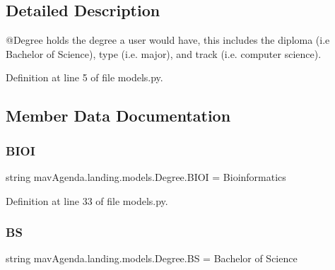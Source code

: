 \subsection{Detailed Description}
\begin{DoxyVerb}@Degree holds the degree a user would have, this includes the
        diploma (i.e Bachelor of Science), type (i.e. major),
        and track (i.e. computer science).
\end{DoxyVerb}
 

Definition at line 5 of file models.\+py.



\subsection{Member Data Documentation}
\mbox{\label{classmavAgenda_1_1landing_1_1models_1_1Degree_ab8fae6c0bef1560ac8435e4d6c555a3a}} 
\subsubsection{\texorpdfstring{B\+I\+OI}{BIOI}}
{\footnotesize\ttfamily string mav\+Agenda.\+landing.\+models.\+Degree.\+B\+I\+OI = \textquotesingle{}Bioinformatics\textquotesingle{}\hspace{0.3cm}{\ttfamily [static]}}



Definition at line 33 of file models.\+py.

\mbox{\label{classmavAgenda_1_1landing_1_1models_1_1Degree_ac78267af5ecd7a08c46f236368bf0fff}} 
\subsubsection{\texorpdfstring{BS}{BS}}
{\footnotesize\ttfamily string mav\+Agenda.\+landing.\+models.\+Degree.\+BS = \textquotesingle{}Bachelor of Science\textquotesingle{}\hspace{0.3cm}{\ttfamily [static]}}



